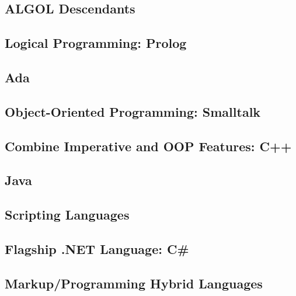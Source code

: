 \subsection{ALGOL Descendants}\label{subsec:ALGOL_Descendants}
\subsection{Logical Programming: Prolog}\label{subsec:Logical_Programming-Prolog}
\subsection{Ada}\label{subsec:Ada}
\subsection{Object-Oriented Programming: Smalltalk}\label{subsec:OOP-Smalltalk}
\subsection{Combine Imperative and OOP Features: C++}\label{subsec:Imperative_OOP-CPP}
\subsection{Java}\label{subsec:Java}
\subsection{Scripting Languages}\label{subsec:Scripting_Languages}
\subsection{Flagship .NET Language: C\#}\label{subsec:C_Sharp}
\subsection{Markup/Programming Hybrid Languages}\label{subsec:Markup_Programming_Hybrid_Languages}

